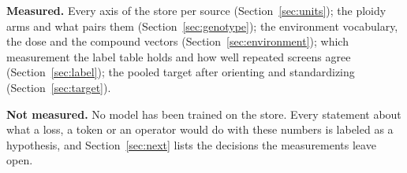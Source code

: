 \begin{keybox}
\textbf{Measured.} Every axis of the store per source (Section~\ref{sec:units}); the
ploidy arms and what pairs them (Section~\ref{sec:genotype}); the environment vocabulary,
the dose and the compound vectors (Section~\ref{sec:environment}); which measurement the
label table holds and how well repeated screens agree (Section~\ref{sec:label}); the pooled
target after orienting and standardizing (Section~\ref{sec:target}).

\textbf{Not measured.} No model has been trained on the store. Every statement about what
a loss, a token or an operator would do with these numbers is labeled as a hypothesis, and
Section~\ref{sec:next} lists the decisions the measurements leave open.
\end{keybox}
